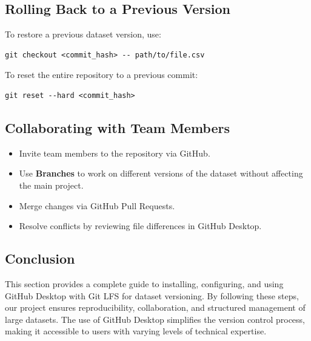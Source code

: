\subsection{Rolling Back to a Previous Version}
To restore a previous dataset version, use:
\begin{verbatim}
git checkout <commit_hash> -- path/to/file.csv
\end{verbatim}

To reset the entire repository to a previous commit:
\begin{verbatim}
git reset --hard <commit_hash>
\end{verbatim}

\subsection{Collaborating with Team Members}
\begin{itemize}
    \item Invite team members to the repository via GitHub.
    \item Use \textbf{Branches} to work on different versions of the dataset without affecting the main project.
    \item Merge changes via GitHub Pull Requests.
    \item Resolve conflicts by reviewing file differences in GitHub Desktop.
\end{itemize}

\subsection{Conclusion}
This section provides a complete guide to installing, configuring, and using GitHub Desktop with Git LFS for dataset versioning. By following these steps, our project ensures reproducibility, collaboration, and structured management of large datasets. The use of GitHub Desktop simplifies the version control process, making it accessible to users with varying levels of technical expertise.


